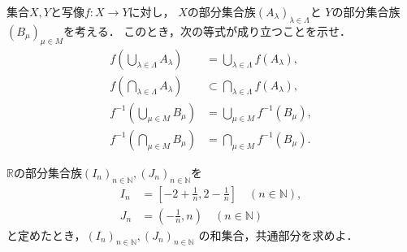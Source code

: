     \begin{que} \label{que:mappingfamirysubset}
      集合$X,  Y$と写像$f: X \longrightarrow Y$に対し，
      $X$の部分集合族$(A_\lambda)_{\lambda \in \varLambda}$と
      $Y$の部分集合族$(B_\mu) _{\mu \in M}$を考える．
      このとき，次の等式が成り立つことを示せ．
      \begin{align}
        f \left( \bigcup_{\lambda \in \varLambda} A_\lambda \right)
        & = \bigcup_{\lambda \in \varLambda} f(A_\lambda) ,
        \label{eq:fcupfamiryX} \\
        f \left( \bigcap_{\lambda \in \varLambda} A_\lambda \right)
        & \subset \bigcap_{\lambda \in \varLambda} f(A_\lambda) ,
        \label{eq:fcapfamiryX} \\
        f^{-1} \left( \bigcup_{\mu \in M } B_\mu \right) 
        & = \bigcup_{\mu \in M} f^{-1} (B_\mu) ,
        \label{eq:fincupfamiryY} \\
        f^{-1} \left( \bigcap_{\mu \in M} B_\mu \right) 
        & = \bigcap_{\mu \in M} f^{-1} (B_\mu) .
        \label{eq:fincapfamiryY}
      \end{align}
    \end{que}

    \begin{que} \label{que:unioninteisectionfamiry} 
      $\mathbb{R}$の部分集合族$(I_n)_{n \in \mathbb{N}} ,  (J_n)_{n \in \mathbb{N}}$を
     \begin{align*}
       I_n & = \left[ -2 + \frac{1}{n}, 2 - \frac{1}{n} \right]  \quad (n \in \mathbb{N}) , \\
       J_n & = \left( - \frac{1}{n} , n \right) \quad ( n \in \mathbb{N})
     \end{align*}
     と定めたとき，$(I_n)_{n \in \mathbb{N}} ,  (J_n)_{n \in \mathbb{N}}$
     の和集合，共通部分を求めよ．
    \end{que}



